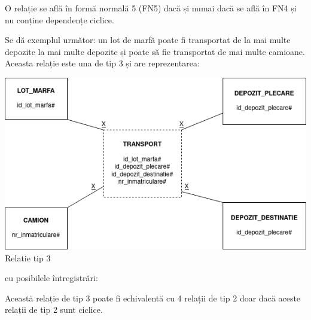 \documentclass[12pt, a4paper]{article}
\begin{document}
\newpage

O relație se află în formă normală 5 (FN5) dacă și numai dacă se află în FN4 și nu conține dependențe ciclice.

Se dă exemplul următor: un lot de marfă poate fi transportat de la mai multe depozite la mai multe depozite și poate să fie transportat de mai multe camioane. Aceasta relație este una de tip 3 și are reprezentarea:

\includegraphics[width=\textwidth]{fn5_rel_3.png}
\label{rel3}
\centering Relatie tip 3

\justifying 
cu posibilele întregistrări:

\begin{table}[!htbp]
\begin{center}
    \caption{Relația \emph{transport}}\label{tab15}
\end{center}
\end{table}

Această relație de tip 3 poate fi echivalentă cu 4 relații de tip 2 doar dacă aceste relații de tip 2 sunt ciclice.
\end{document}
